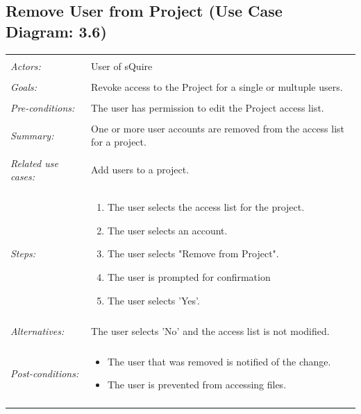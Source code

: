 \documentclass[11pt]{report}
\begin{document}
\subsection{Remove User from Project (Use Case Diagram: 3.6)}
\begin{tabular}{ p{2cm} p{12cm} }   
 \hline
 \\
 \textit{Actors:} & User of sQuire \\
 \\
 \textit{Goals:} & Revoke access to the Project for a single or multuple users. \\
 \\
 \textit{Pre-conditions:} & The user has permission to edit the Project access list. \\
 \\
 \textit{Summary:} & One or more user accounts are removed from the access list for a project. \\ 
 \\
 \textit{Related use cases:} & Add users to a project.  \\ 
 \\
 \textit{Steps:} & \begin{enumerate}
  \item The user selects the access list for the project.
	 \item The user selects an account. 
	 \item The user selects "Remove from Project".
	 \item The user is prompted for confirmation
	 \item The user selects 'Yes'.
 \end{enumerate} \\
 \\
 \textit{Alternatives:} & The user selects 'No' and the access list is not modified. \\
 \\
 \textit{Post-conditions:} &
    \begin{itemize}
	 \item The user that was removed is notified of the change.
	 \item The user is prevented from accessing files.
    \end{itemize}\\
 \\
\hline
\end{tabular}
\end{document}
